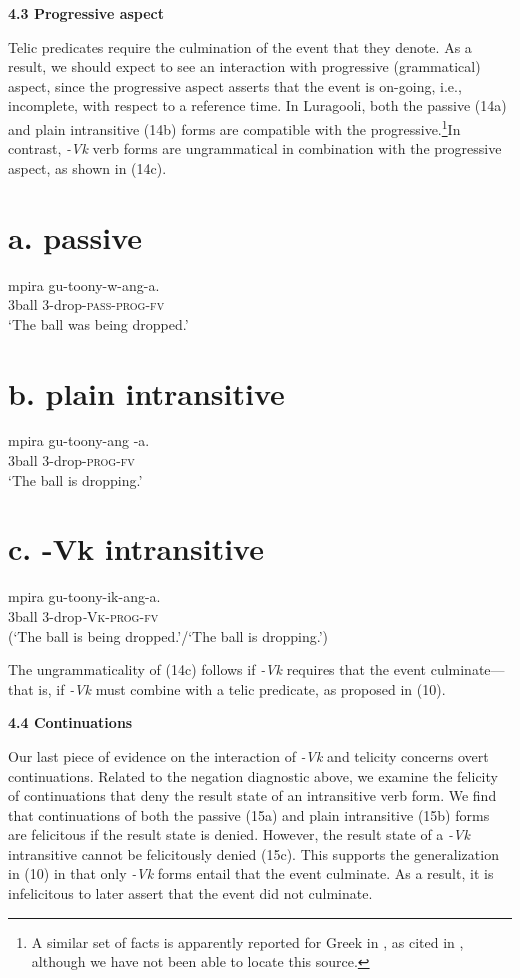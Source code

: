\documentclass[output=paper]{langsci/langscibook}
\begin{document}
\begin{styleTabellenberschrift}
\textbf{4.3 Progressive aspect}

Telic predicates require the culmination of the event that they denote. As a result, we should expect to see an interaction with progressive (grammatical) aspect, since the progressive aspect asserts that the event is on-going, i.e., incomplete, with respect to a reference time. In Luragooli, both the passive (14a) and plain intransitive (14b) forms are compatible with the progressive.\footnote{ A similar set of facts is apparently reported for Greek in \citet{Mavromanolaki2002}, as cited in \citet{AlexiadouEtAl2015}, although we have not been able to locate this source. }In contrast, \textit{{}-Vk} verb forms are ungrammatical in combination with the progressive aspect, as shown in (14c).

\chapter[a. passive]{a. \textbf{passive}}
\gll mpira gu-toony-w-ang-a.\\
     3ball  3-drop-\textsc{pass}{}-\textsc{prog}{}-\textsc{fv}\\
\glt ‘The ball was being dropped.’
\z

\chapter[b. plain intransitive]{b.\textbf{ plain intransitive}}
\gll mpira gu-toony-ang -a.\\
     3ball  3-drop-\textsc{prog}{}-\textsc{fv}\\
\glt ‘The ball is dropping.’
\z

\chapter[c. {}-Vk intransitive]{c.\textbf{ -Vk intransitive}}
\gll *mpira gu-toony-ik-ang-a.\\
     \textit{ }3ball    3-drop\textit{{}-}\textsc{Vk}{}-\textsc{prog}{}-\textsc{fv}\\
\glt  (‘The ball is being dropped.’/‘The ball is dropping.’)
\z

The ungrammaticality of (14c) follows if \textit{{}-Vk} requires that the event culminate—that is, if \textit{{}-Vk} must combine with a telic predicate, as proposed in (10).

\textbf{4.4 Continuations}

Our last piece of evidence on the interaction of \textit{{}-Vk} and telicity concerns overt continuations. Related to the negation diagnostic above, we examine the felicity of continuations that deny the result state of an intransitive verb form. We find that continuations of both the passive (15a) and plain intransitive (15b) forms are felicitous if the result state is denied. However, the result state of a \textit{{}-Vk} intransitive cannot be felicitously denied (15c). This supports the generalization in (10) in that only \textit{{}-Vk} forms entail that the event culminate. As a result, it is infelicitous to later assert that the event did not culminate.


\end{styleTabellenberschrift}
\end{document}
